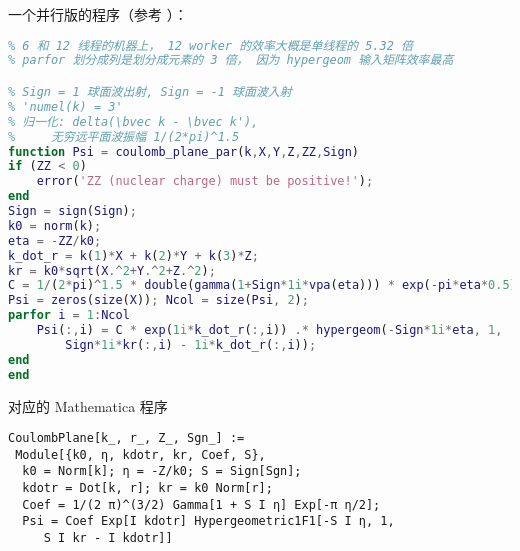 一个并行版的程序（参考 ）：
\begin{lstlisting}[language=matlab, caption=coulomb\_plane\_par.m]
% 直角坐标系的库仑平面波 （coulomb_plane 的并行版， 需要 parallel toolbox）
% 6 和 12 线程的机器上， 12 worker 的效率大概是单线程的 5.32 倍
% parfor 划分成列是划分成元素的 3 倍， 因为 hypergeom 输入矩阵效率最高

% Sign = 1 球面波出射, Sign = -1 球面波入射
% 'numel(k) = 3'
% 归一化: delta(\bvec k - \bvec k'),
%     无穷远平面波振幅 1/(2*pi)^1.5
function Psi = coulomb_plane_par(k,X,Y,Z,ZZ,Sign)
if (ZZ < 0)
    error('ZZ (nuclear charge) must be positive!');
end
Sign = sign(Sign);
k0 = norm(k);
eta = -ZZ/k0;
k_dot_r = k(1)*X + k(2)*Y + k(3)*Z;
kr = k0*sqrt(X.^2+Y.^2+Z.^2);
C = 1/(2*pi)^1.5 * double(gamma(1+Sign*1i*vpa(eta))) * exp(-pi*eta*0.5);
Psi = zeros(size(X)); Ncol = size(Psi, 2);
parfor i = 1:Ncol
    Psi(:,i) = C * exp(1i*k_dot_r(:,i)) .* hypergeom(-Sign*1i*eta, 1, ....
        Sign*1i*kr(:,i) - 1i*k_dot_r(:,i));
end
end
\end{lstlisting}

对应的 Mathematica 程序 %
\begin{lstlisting}[language=mma]
CoulombPlane[k_, r_, Z_, Sgn_] := 
 Module[{k0, η, kdotr, kr, Coef, S},
  k0 = Norm[k]; η = -Z/k0; S = Sign[Sgn];
  kdotr = Dot[k, r]; kr = k0 Norm[r];
  Coef = 1/(2 π)^(3/2) Gamma[1 + S I η] Exp[-π η/2];
  Psi = Coef Exp[I kdotr] Hypergeometric1F1[-S I η, 1, 
     S I kr - I kdotr]]
\end{lstlisting}
